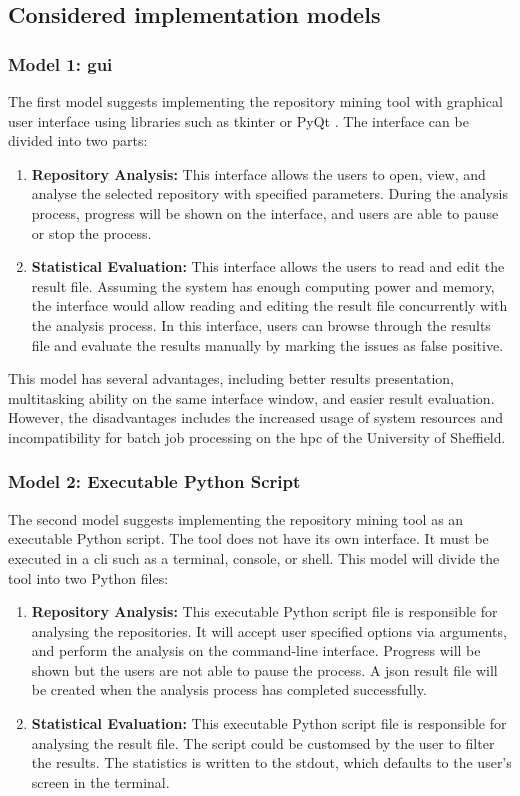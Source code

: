 \documentclass[12pt, a4paper]{report}
\begin{document}
\subsection{Considered implementation models}
\subsubsection*{Model 1: \acrfull{gui}} \label{subsec:model1}
The first model suggests implementing the repository mining tool with graphical user interface using
libraries such as tkinter \cite{tkinter} or PyQt \cite{pyqt}. The interface can be divided into two
parts:
\begin{enumerate}
  \item \textbf{Repository Analysis:} This interface allows the users to open, view, and analyse the
  selected repository with specified parameters. During the analysis process, progress will be shown
  on the interface, and users are able to pause or stop the process.
  \item \textbf{Statistical Evaluation:} This interface allows the users to read and edit the result
  file. Assuming the system has enough computing power and memory, the interface would allow reading
  and editing the result file concurrently with the analysis process. In this interface, users can
  browse through the results file and evaluate the results manually by marking the issues as false
  positive.
\end{enumerate}

This model has several advantages, including better results presentation, multitasking ability on
the same interface window, and easier result evaluation. However, the disadvantages includes the
increased usage of system resources and incompatibility for batch job processing on the
\acrfull{hpc} of the University of Sheffield.

\subsubsection*{Model 2: Executable Python Script}\label{subsec:model2}
The second model suggests implementing the repository mining tool as an executable Python script.
The tool does not have its own interface. It must be executed in a \acrfull{cli} such as a terminal,
console, or shell. This model will divide the tool into two Python files:
\begin{enumerate}
  \item \textbf{Repository Analysis:} This executable Python script file is responsible for
  analysing the repositories. It will accept user specified options via arguments, and perform the
  analysis on the command-line interface. Progress will be shown but the users are not able to pause
  the process. A \acrshort{json} result file will be created when the analysis process has completed
  successfully.
  \item \textbf{Statistical Evaluation:} This executable Python script file is responsible for
  analysing the result file. The script could be customsed by the user to filter the results. The
  statistics is written to the \acrfull{stdout}, which defaults to the user's screen in the
  terminal.
\end{enumerate}
\end{document}
